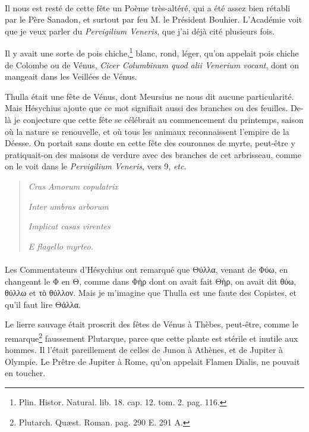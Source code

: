 \documentclass[a4paper, 18pt, oneside]{article}
\begin{document}
\paragraph{}
Il nous est resté de cette fête un Poème très-altéré, qui a été assez bien rétabli par le Père Sanadon, et surtout par feu M. le Président Bouhier. L'Académie voit que je veux parler du \emph{Pervigilium Veneris}, que j'ai déjà cité plusieurs fois.

Il y avait une sorte de pois chiche,\footnote{Plin. Histor. Natural. lib. 18. cap. 12. tom. 2. pag. 116.} blanc, rond, léger, qu'on appelait pois chiche de Colombe ou de Vénus, \emph{Cicer Columbinum quod alii Venerium vocant}, dont on mangeait dans les Veillées de Vénus.

Thulla était une fête de Vénus, dont Meursius ne nous dit aucune particularité. Mais Hésychius ajoute que ce mot signifiait aussi des branches ou des feuilles. De-là je conjecture que cette fête se célébrait au commencement du printemps, saison où la nature se renouvelle, et où tous les animaux reconnaissent l'empire de la Déesse. On portait sans doute en cette fête des couronnes de myrte, peut-être y pratiquait-on des maisons de verdure avec des branches de cet arbrisseau, comme on le voit dans le \emph{Pervigilium Veneris}, vers 9, \emph{etc.}
\begin{quotation}
\emph{Cras Amorum copulatrix}

\hspace*{5mm}\emph{Inter umbras arborum}

\emph{Implicat casas virentes}

\hspace*{5mm}\emph{E flagello myrteo.}
\end{quotation}
\paragraph{}
Les Commentateurs d'Hésychius ont remarqué que Θύλλα, venant de Φύω, en changeant le Φ en Θ, comme dans Φὴρ dont on avait fait Θὴρ, on avait dit θύω, θύλλω et τὸ θύλλον. Mais je m'imagine que Thulla est une faute des Copistes, et qu'il faut lire Θάλλα.

Le lierre sauvage était proscrit des fêtes de Vénus à Thèbes, peut-être, comme le remarque\footnote{Plutarch. Quæst. Roman. pag. 290 E. 291 A.} faussement Plutarque, parce que cette plante est stérile et inutile aux hommes. Il l'était pareillement de celles de Junon à Athènes, et de Jupiter à Olympie. Le Prêtre de Jupiter à Rome, qu'on appelait Flamen Dialis, ne pouvait en toucher.
\end{document}
